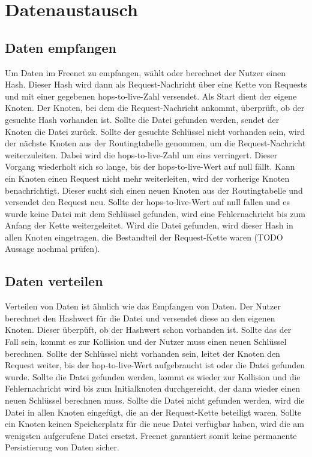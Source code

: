 \section{Datenaustausch}
\subsection{Daten empfangen}
Um Daten im Freenet zu empfangen, wählt oder berechnet der Nutzer einen Hash.
Dieser Hash wird dann als Request-Nachricht über eine Kette von Requests und
mit einer gegebenen hops-to-live-Zahl versendet. Als Start dient der eigene Knoten.
Der Knoten, bei dem die Request-Nachricht ankommt, überprüft, ob der gesuchte
Hash vorhanden ist. Sollte die Datei gefunden werden, sendet der Knoten
die Datei zurück. Sollte der gesuchte Schlüssel nicht vorhanden sein, wird
der nächste Knoten aus der Routingtabelle genommen, um die Request-Nachricht
weiterzuleiten. Dabei wird die hops-to-live-Zahl um eins verringert. Dieser
Vorgang wiederholt sich so lange, bis der hops-to-live-Wert auf null fällt.
Kann ein Knoten einen Request nicht mehr weiterleiten, wird der vorherige
Knoten benachrichtigt. Dieser sucht sich einen neuen Knoten aus der
Routingtabelle und versendet den Request neu. Sollte der hops-to-live-Wert auf
null fallen und es wurde keine Datei mit dem Schlüssel gefunden, wird eine
Fehlernachricht bis zum Anfang der Kette weitergeleitet.
Wird die Datei gefunden, wird dieser Hash in allen Knoten eingetragen, die
Bestandteil der Request-Kette waren (TODO Aussage nochmal prüfen).

\subsection{Daten verteilen}
Verteilen von Daten ist ähnlich wie das Empfangen von Daten. Der Nutzer
berechnet den Hashwert für die Datei und versendet diese an den eigenen Knoten.
Dieser überpüft, ob der Hashwert schon vorhanden ist. Sollte das der Fall sein,
kommt es zur Kollision und der Nutzer muss einen neuen Schlüssel berechnen.
Sollte der Schlüssel nicht vorhanden sein, leitet der Knoten den Request
weiter, bis der hop-to-live-Wert aufgebraucht ist oder die Datei gefunden
wurde. Sollte die Datei gefunden werden, kommt es wieder zur Kollision und die
Fehlernachricht wird bis zum Initialknoten durchgereicht, der dann wieder einen
neuen Schlüssel berechnen muss. Sollte die Datei nicht gefunden werden, wird
die Datei in allen Knoten eingefügt, die an der Request-Kette beteiligt waren.
Sollte ein Knoten keinen Speicherplatz für die neue Datei verfügbar haben,
wird die am wenigsten aufgerufene Datei ersetzt. Freenet garantiert somit keine
permanente Persistierung von Daten sicher.
